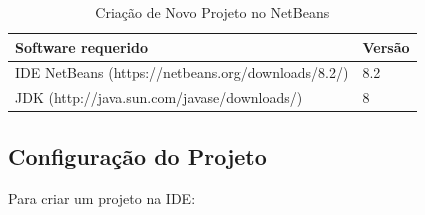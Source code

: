 \documentclass[
	12pt,				%
	twoside,			%
	a4paper,			%
	english,			%
	french,				%
	spanish,			%
	brazil				%
	]{abntex2}
\begin{document}
\begin{table}[h]
\begin{center}
\begin{tabular}{l|l}
Software requerido & Versão\\
\hline
IDE NetBeans (https://netbeans.org/downloads/8.2/) & 8.2\\
JDK (http://java.sun.com/javase/downloads/) & 8
\end{tabular}
\end{center}
\caption{Criação de Novo Projeto no NetBeans}
\label{tab:softwares}
\end{table}

\subsection{Configuração do Projeto}

Para criar um projeto na IDE:
\end{document}
